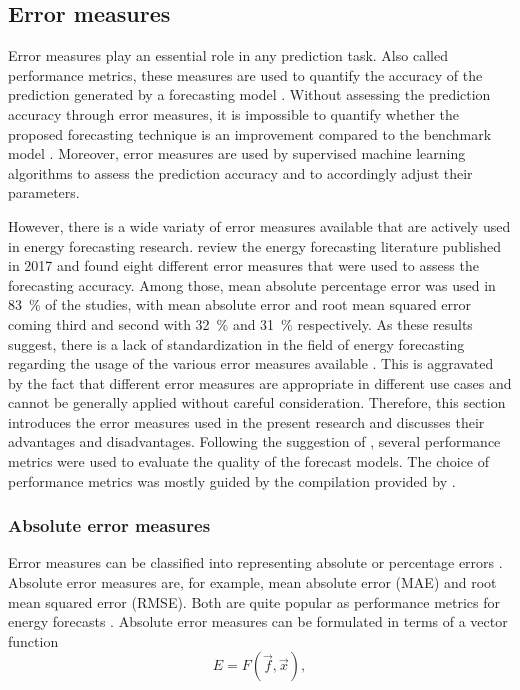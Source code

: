 
\subsection{Error measures} \label{Sec:Method;Subsec:Error}

Error measures play an essential role in any prediction task. Also called performance metrics, these measures are used to quantify the accuracy of the prediction generated by a forecasting model \citep{zor:2017}. Without assessing the prediction accuracy through error measures, it is impossible to quantify whether the proposed forecasting technique is an improvement compared to the benchmark model \citep{Meer:2018}. Moreover, error measures are used by supervised machine learning algorithms to assess the prediction accuracy and to accordingly adjust their parameters.

However, there is a wide variaty of error measures available that are actively used in energy forecasting research. \citet{zor:2017} review the energy forecasting literature published in 2017 and found eight different error measures that were used to assess the forecasting accuracy. Among those, mean absolute percentage error was used in 83~\% of the studies, with mean absolute error and root mean squared error coming third and second with 32~\% and 31~\% respectively. As these results suggest, there is a lack of standardization in the field of energy forecasting regarding the usage of the various error measures available \citep[see also][]{Meer:2018}. This is aggravated by the fact that different error measures are appropriate in different use cases and cannot be generally applied without careful consideration. Therefore, this section introduces the error measures used in the present research and discusses their advantages and disadvantages. Following the suggestion of \citet{Hoff:2013}, several performance metrics were used to evaluate the quality of the forecast models. The choice of performance metrics was mostly guided by the compilation provided by \citet{Meer:2018}.


\subsubsection{Absolute error measures}

Error measures can be classified into representing absolute or percentage errors \citep{Hoff:2013}. Absolute error measures are, for example, mean absolute error (MAE) and root mean squared error (RMSE). Both are quite popular as performance metrics for energy forecasts \citep{zor:2017}. Absolute error measures can be formulated in terms of a vector function 
%
\begin{equation} \label{Eq:vectorfunction}
    E=F\left(\vec{f}, \vec{x}\right),
\end{equation}

